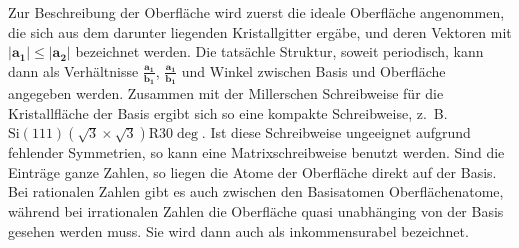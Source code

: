Zur Beschreibung der Oberfläche wird zuerst die ideale Oberfläche angenommen, 
die sich aus dem darunter liegenden Kristallgitter ergäbe, und deren Vektoren mit
$|\mathbf{a_1}| \le |\mathbf{a_2}|$ bezeichnet werden. Die tatsächle Struktur, 
soweit periodisch, kann dann als Verhältnisse $\frac{\mathbf{a_1}}{\mathbf{b_1}}$, 
$\frac{\mathbf{a_1}}{\mathbf{b_1}}$ und Winkel zwischen Basis und Oberfläche angegeben 
werden. Zusammen mit der Millerschen Schreibweise für die Kristallfläche der Basis 
ergibt sich so eine kompakte Schreibweise, z.~B. 
$\mathrm{Si}(111)(\sqrt{3} \times \sqrt{3}) \mathrm{R} 30 \deg$. 
Ist diese Schreibweise ungeeignet aufgrund fehlender Symmetrien, so kann eine 
Matrixschreibweise benutzt werden. Sind die Einträge ganze Zahlen, so liegen die 
Atome der Oberfläche direkt auf der Basis. Bei rationalen Zahlen gibt es auch 
zwischen den Basisatomen Oberflächenatome, während bei irrationalen Zahlen die 
Oberfläche quasi unabhänging von der Basis gesehen werden muss. Sie wird dann auch 
als inkommensurabel bezeichnet. \cite{henzler1991oberflachenphysik}

